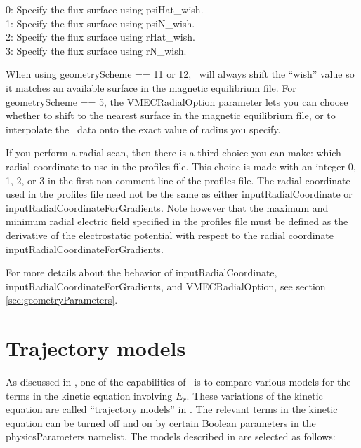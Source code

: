 {\setlength{\parindent}{0cm}

0: Specify the flux surface using {\ttfamily psiHat\_wish}.\\

1: Specify the flux surface using {\ttfamily psiN\_wish}.\\

2: Specify the flux surface using {\ttfamily rHat\_wish}.\\

3: Specify the flux surface using {\ttfamily rN\_wish}.\\

}

When using {\ttfamily geometryScheme} == 11 or 12, \sfincs~will always shift the ``wish'' value so it matches an available surface in the magnetic equilibrium file.
For {\ttfamily geometryScheme} == 5, the {\ttfamily VMECRadialOption} parameter lets you can choose whether to shift to the nearest surface in the magnetic equilibrium file,
or to interpolate the \vmec~data onto the exact value of radius you specify.

If you perform a radial scan, then there is a third choice you can make: which radial coordinate to use in the {\ttfamily profiles} file.
This choice is made with an integer 0, 1, 2, or 3 in the first non-comment line of the {\ttfamily profiles} file.
The radial coordinate used in the {\ttfamily profiles} file need not be the same as either
{\ttfamily inputRadialCoordinate} or {\ttfamily inputRadialCoordinateForGradients}.
Note however that the maximum and minimum radial electric field specified in the {\ttfamily profiles}
file must be defined as the derivative of the electrostatic potential with respect to the radial coordinate {\ttfamily inputRadialCoordinateForGradients}.

For more details about the behavior of {\ttfamily inputRadialCoordinate}, {\ttfamily inputRadialCoordinateForGradients}, and {\ttfamily VMECRadialOption},
see section \ref{sec:geometryParameters}.



\section{Trajectory models}

As discussed in \cite{sfincsPaper},
one of the capabilities of \sfincs~is to compare various models for the terms in the kinetic equation involving $E_r$.
These variations of the kinetic equation are called ``trajectory models'' in \cite{sfincsPaper}.
The relevant terms in the kinetic equation can be turned off and on by certain Boolean parameters in the {\ttfamily physicsParameters} namelist.
The models described in \cite{sfincsPaper} are selected as follows:\\


